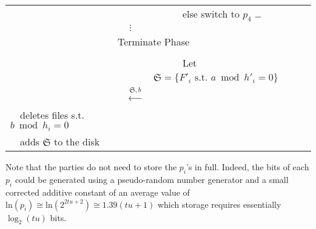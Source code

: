 \documentclass[11pt]{llncs}
\begin{document}
\begin{center}
\begin{tabular}{|lcl|}
                                   &                                                      &~~~~~~else switch to $p_4$ \ldots~~\\
                                   &                  $\vdots$                            & \\\hline\hline
\multicolumn{3}{|c|}{{\sf Terminate Phase~~}} \\\hline
                                   &                                                      & \\
                                   &                                                      &~~~~~~Let $\mathfrak{S}=\{F'_i \mbox{~s.t.~} a \bmod h'_i =0\}$~~\\
                                   &~~{\LARGE $\stackrel{\mathfrak{S},b}{\longleftarrow}$}&\\
                                   ~~deletes files s.t. $b \bmod h_i =0$&                                                      &\\
                                   ~~adds $\mathfrak{S}$ to the disk    &                                                      &\\\hline
\end{tabular}
\end{center}

Note that the parties do not need to store the $p_i$'s in full. Indeed, the bits of each $p_i$ could be generated using a pseudo-random number generator and a small corrected additive constant of an average value of $\mbox{ln}(p_i) \cong \mbox{ln}(2^{2tu+2}) \cong 1.39(tu+1)$ which storage
requires essentially $\log_2(tu)$ bits.
\end{document}
